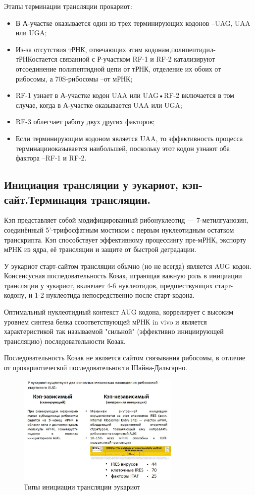 Этапы терминации трансляции прокариот:

\begin{itemize}
    \item В А-участке оказывается один из трех терминирующих кодонов –UAG, UAA или UGA;
    \item Из-за отсутствия тРНК, отвечающих этим кодонам,полипептидил-тРНКостается связанной с Р-участком RF-1 и RF-2 катализируют отсоединение полипептидной цепи от тРНК, отделение их обоих от рибосомы, а 70S-рибосомы –от мРНК;
    \item RF-1 узнает в А-участке кодон UAA или UAG•RF-2 включается в том случае, когда в А-участке оказывается UAA или UGA;
    \item RF-3 облегчает работу двух других факторов;
    \item Если терминирующим кодоном является UAA, то эффективность процесса терминацииоказывается наибольшей, поскольку этот кодон узнают оба фактора –RF-1 и RF-2.
\end{itemize}

\subsection{Инициация трансляции у эукариот, кэп-сайт.Терминация трансляции.}

Кэп представляет собой модифицированный рибонуклеотид — 7-метилгуанозин, соединённый 5'-трифосфатным мостиком с первым нуклеотидным остатком транскрипта. Кэп способствует эффективному процессингу пре-мРНК, экспорту мРНК из ядра, её трансляции и защите от быстрой деградации.

У эукариот старт-сайтом трансляции обычно (но не всегда) является AUG кодон.
Консенсусная последовательность Козак, играющая важную роль в инициации трансляции у эукариот, включает 4-6 нуклеотидов, предшествующих старт-кодону, и 1-2 нуклеотида непосредственно после старт-кодона. 

Оптимальный нуклеотидный контекст AUG кодона, коррелирует с высоким уровнем синтеза белка ссоответствующей мРНК in vivo и является характеристикой так называемой "сильной" (эффективно инициирующей трансляцию) последовательности Козак.

Последовательность Козак не является сайтом связывания рибосомы, в отличие от прокариотической последовательности Шайна-Дальгарно.

\begin{figure}[h]
    \centering
    \includegraphics[width=0.7\textwidth]{Pictures/5_5(init_eu).jpg}
    \caption{Типы инициации трансляции эукариот}
    \label{fig:5_5(init_eu)}
\end{figure}

